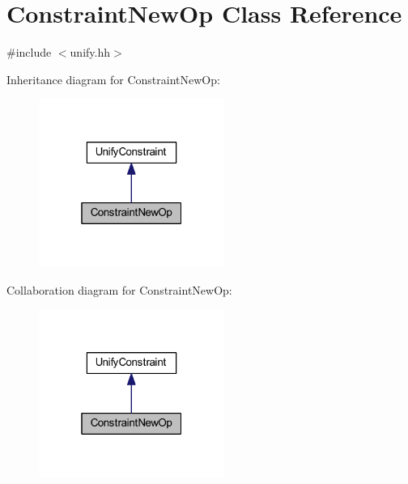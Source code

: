 \hypertarget{class_constraint_new_op}{}\section{Constraint\+New\+Op Class Reference}
\label{class_constraint_new_op}


{\ttfamily \#include $<$unify.\+hh$>$}



Inheritance diagram for Constraint\+New\+Op\+:
\nopagebreak
\begin{figure}[H]
\begin{center}
\leavevmode
\includegraphics[width=172pt]{class_constraint_new_op__inherit__graph}
\end{center}
\end{figure}


Collaboration diagram for Constraint\+New\+Op\+:
\nopagebreak
\begin{figure}[H]
\begin{center}
\leavevmode
\includegraphics[width=172pt]{class_constraint_new_op__coll__graph}
\end{center}
\end{figure}

